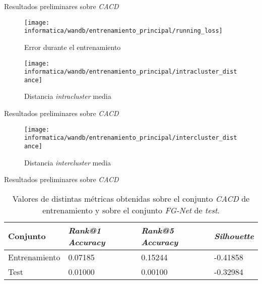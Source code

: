 \begin{frame}{Resultados preliminares sobre \textit{CACD}}
	\begin{figure}
		\texttt{[image: informatica/wandb/entrenamiento\_principal/running\_loss]}
		\caption{Error durante el entrenamiento}
	\end{figure}
\end{frame}
\begin{frame}
	\begin{figure}
		\texttt{[image: informatica/wandb/entrenamiento\_principal/intracluster\_distance]}
		\caption{Distancia \textit{intracluster} media}
	\end{figure}
\end{frame}

\begin{frame}{Resultados preliminares sobre \textit{CACD}}
	\begin{figure}
		\texttt{[image: informatica/wandb/entrenamiento\_principal/intercluster\_distance]}
		\caption{Distancia \textit{intercluster} media}
	\end{figure}

\end{frame}

\begin{frame}{Resultados preliminares sobre \textit{CACD}}
	\begin{table}
		\centering
		\begin{tabular}{|l|l|l|l|}
			\hline
			Conjunto      & \textit{Rank@1 Accuracy} & \textit{Rank@5 Accuracy} & \textit{Silhouette} \\
			\hline

			Entrenamiento & 0.07185                  & 0.15244                  & -0.41858            \\
			Test          & 0.01000                  & 0.00100                  & -0.32984            \\
			\hline
		\end{tabular}
		\caption{Valores de distintas métricas obtenidas sobre el conjunto \textit{CACD} de entrenamiento y sobre el conjunto \textit{FG-Net} de \textit{test}.}
		\label{table:resultados_sobre_fg_net}
	\end{table}

\end{frame}

